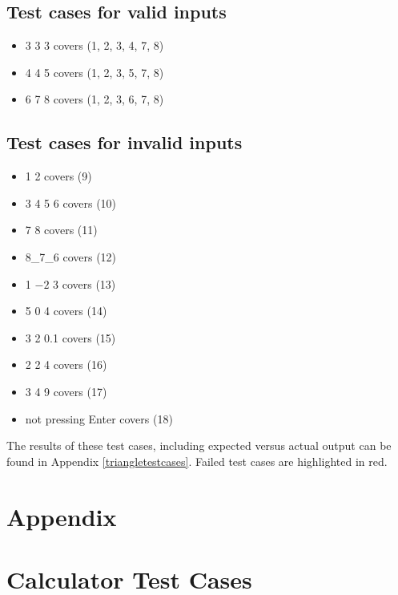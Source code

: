 \documentclass[letterpaper]{article}
\begin{document}
\subsection*{Test cases for valid inputs}
\begin{itemize}
    \item 3 3 3 covers (1, 2, 3, 4, 7, 8)
    \item 4 4 5 covers (1, 2, 3, 5, 7, 8)
    \item 6 7 8 covers (1, 2, 3, 6, 7, 8)
\end{itemize}

\subsection*{Test cases for invalid inputs}
\begin{itemize}
    \item 1 2 covers (9)
    \item 3 4 5 6 covers (10)
    \item 7 8  covers (11)
    \item 8\_7\_6 covers (12)
    \item 1 $-2$ 3 covers (13)
    \item 5 0 4 covers (14)
    \item 3 2 0.1 covers (15)
    \item 2 2 4 covers (16)
    \item 3 4 9 covers (17)
    \item not pressing Enter covers (18)
\end{itemize}

The results of these test cases, including expected versus actual output can be found in Appendix \ref{triangletestcases}.
Failed test cases are highlighted in red.
\appendix
\section*{Appendix}
\section{Calculator Test Cases} \label{calculatortestcases}

\end{document}
